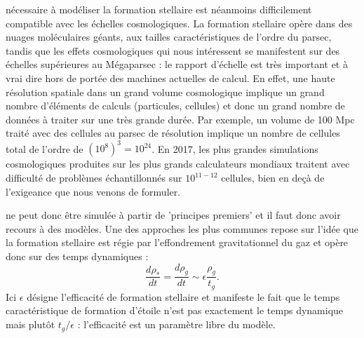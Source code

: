  nécessaire à modéliser la formation stellaire est néanmoins difficilement compatible avec les échelles cosmologiques. La formation stellaire opère dans des nuages moléculaires géants, aux tailles caractéristiques de l'ordre du parsec, tandis que les effets cosmologiques qui nous intéressent se manifestent sur des échelles supérieures au Mégaparsec : le rapport d'échelle est très important et à vrai dire hors de portée des machines actuelles de calcul. En effet, une haute résolution spatiale dans un grand volume cosmologique implique un grand nombre d'éléments de calculs (particules, cellules) et donc un grand nombre de données à traiter sur une très grande durée. Par exemple, un volume de 100 Mpc traité avec des cellules au parsec de résolution implique un nombre de cellules total de l'ordre de $(10^8)^3=10^{24}$. En 2017, les plus grandes simulations cosmologiques produites sur les plus grands calculateurs mondiaux traitent avec difficulté de problèmes échantillonnés sur $10^{11-12}$ cellules, bien en deçà de l'exigeance que nous venons de formuler.

 ne peut donc être simulée à partir de 'principes premiers' et il faut donc avoir recours à des modèles. Une des approches les plus communes repose sur l'idée que la formation stellaire est régie par l'effondrement gravitationnel du gaz et opère donc sur des temps dynamiques :
\begin{equation}
\frac{d \rho_*}{dt}=\frac{d \rho_g}{dt}\sim\epsilon\frac{\rho_g}{t_g}.
\end{equation}
Ici $\epsilon$ désigne l'efficacité de formation stellaire et manifeste le fait que le temps caractéristique de formation d'étoile n'est pas exactement le temps dynamique mais plutôt $t_g/\epsilon$ : l'efficacité est un paramètre libre du modèle.

